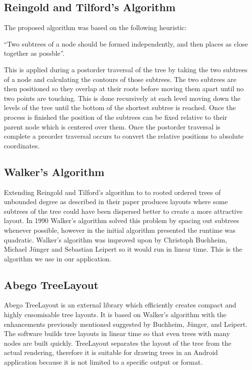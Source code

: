 \documentclass{report}
\begin{document}
\subsection{Reingold and Tilford's Algorithm}

The proposed algorithm was based on the following heuristic: 

``Two subtrees of a node should be formed independently, and then places as close together as possble''\cite{tidierdrawingsws}.

This is applied during a postorder traversal of the tree by taking the two subtrees of a node and calculating the contours of those subtrees. The two subtrees are then positioned so they overlap at their roots before moving them apart until no two points are touching. This is done recursively at each level moving down the levels of the tree until the bottom of the shortest subtree is reached. Once the process is finished the position of the subtrees can be fixed relative to their parent node which is centered over them. Once the postorder traversal is complete a preorder traversal occurs to convert the relative positions to absolute coordinates.

\subsection{Walker's Algorithm}

Extending Reingold and Tilford's algorithm to to rooted ordered trees of unbounded degree as described in their paper produces layouts where some subtrees of the tree could have been dispersed better to create a more attractive layout. In 1990 Walker's algorithm solved this problem by spacing out subtrees whenever possible, however in the initial algorithm presented the runtime was quadratic. Walker's algorithm was improved upon by Christoph Buchheim, Michael J\"unger and Sebastian Leipert so it would run in linear time\cite{improvingwalkers}. This is the algorithm we use in our application. 

\subsection{Abego TreeLayout}

Abego TreeLayout is an external library which efficiently creates compact and highly cusomisable tree layouts. It is based on Walker's algorithm with the enhancements previously mentioned suggested by Buchheim, J\"unger, and Leipert\cite{treelayoutlineartime}. The software builds tree layouts in linear time so that even trees with many nodes are built quickly. TreeLayout separates the layout of the tree from the actual rendering, therefore it is suitable for drawing trees in an Android application because it is not limited to a specific output or format.
\end{document}

